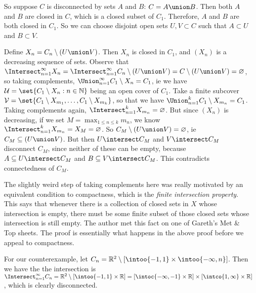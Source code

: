 \documentclass[a4paper,12pt,fleqn]{article}
\begin{document}
\begin{enumerate}[label=\arabic*.,leftmargin=*]
\begin{enumerate}[label=(\alph*)]
    So suppose \(C\) is disconnected by sets \(A\) and \(B\):
    \(C = A \union B\). Then both \(A\) and \(B\) are closed in \(C\), which is
    a closed subset of \(C_1\). Therefore, \(A\) and \(B\) are both closed in
    \(C_1\). So we can choose disjoint open sets \(U, V \subset C\) such that
    \(A \subset U\) and \(B \subset V\).

    Define \(X_n = C_n \setminus (U \union V)\). Then \(X_n\) is closed
    in \(C_1\), and \((X_n)\) is a decreasing sequence of sets. Observe that
    \(\Intersect_{n = 1}^\infty X_n
      = \Intersect_{n = 1}^\infty C_n \setminus (U \union V)
      = C \setminus (U \union V) = \emptyset\), so taking complements,
    \(\Union_{n = 1}^\infty C_1 \setminus X_n = C_1\), ie we have
    \(\mathcal U = \set{C_1 \setminus X_n : n \in \N}\) being an open cover of
    \(C_1\). Take a finite subcover
    \(\mathcal V = \set{C_1 \setminus X_{m_1}, \dotsc, C_1 \setminus X_{m_k}}\),
    so that we have \(\Union_{n = 1}^k C_1 \setminus X_{m_n} = C_1\). Taking
    complements again, \(\Intersect_{n = 1}^k X_{m_n} = \emptyset\). But since
    \((X_n)\) is decreasing, if we set \(M = \max_{1 \le n \le k} m_n\), we know
    \(\Intersect_{n = 1}^k X_{m_n} = X_M = \emptyset\). So
    \(C_M \setminus (U \union V) = \emptyset\), ie
    \(C_M \subset (U \union V)\). But then
    \(U \intersect C_M\) and \(V \intersect C_M\) disconnect \(C_M\), since
    neither of these can be empty, because \(A \subset U \intersect C_M\) and
    \(B \subset V \intersect C_M\).
    This contradicts connectedness of \(C_M\).
    \begin{remark}
     The slightly weird step of taking complements here was really motivated by
     an equivalent condition to compactness, which is the \emph{finite
     intersection property}. This says that whenever there is a collection of
     closed sets in \(X\) whose intersection is empty, there must be some finite
     subset of those closed sets whose intersection is still empty. The author
     met this fact on one of Gareth's Met \& Top sheets. The proof is
     essentially what happens in the above proof before we appeal to
     compactness.
    \end{remark}
    For our counterexample, let
    \(C_n = \R^2 \setminus [\intoo{-1, 1}  \times \intoo{-\infty, n}]\). Then we
    have the the intersection is
    \(\Intersect_{n = 1}^\infty C_n
      = \R^2 \setminus [\intoo{-1, 1} \times \R]
      = [\intoc{-\infty, -1} \times \R] \times [\intco{1, \infty} \times \R]\),
    which is clearly disconnected.
  \end{enumerate}

\end{enumerate}
\end{document}
